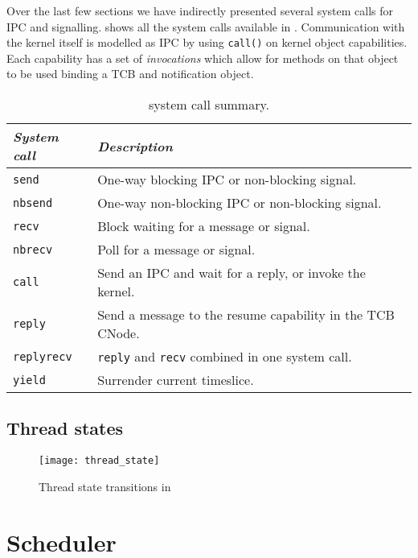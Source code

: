Over the last few sections we have indirectly presented several system calls for \gls{IPC} and
signalling.  shows all the system calls available in \selfour. Communication
with the kernel itself is modelled as \gls{IPC} by using \texttt{call()} on kernel object
capabilities. Each capability has a set of \emph{invocations} which allow for methods on that object
to be used \eg binding a \gls{TCB} and notification object.

\begin{table} 
    \centering
    \begin{tabular}{lp{}}\toprule
        \emph{System call} & \emph{Description} \\\midrule
        \texttt{send}      & One-way blocking \gls{IPC} or non-blocking signal.\\
        \texttt{nbsend}    & One-way non-blocking \gls{IPC} or non-blocking signal.\\
        \texttt{recv}      & Block waiting for a message or signal. \\
        \texttt{nbrecv}    & Poll for a message or signal. \\
        \texttt{call}      & Send an IPC and wait for a reply, or invoke the kernel. \\
        \texttt{reply}     & Send a message to the resume capability in the TCB CNode.\\
        \texttt{replyrecv} & \texttt{reply} and \texttt{recv} combined in one system call.\\
        \texttt{yield}     & Surrender current timeslice. \\
        \bottomrule
    \end{tabular}
    \caption{\selfour system call summary.}
    \label{t:system-calls}
\end{table}

\subsection{Thread states}

\begin{figure}[h!tb]
    \centering
    \texttt{[image: thread\_state]}
    \caption{Thread state transitions in \selfour}
    \label{f:thread_state}
\end{figure}


\section{Scheduler}

